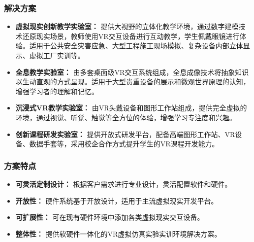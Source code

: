 \subsubsection{解决方案}
\begin{itemize}
    \item \textbf{虚拟现实创新教学实验室：} 提供大视野的立体化教学环境，通过数字建模技术还原现实场景，教师使用VR交互设备进行互动教学，学生佩戴眼镜进行体验。适用于公共安全灾害应急、大型工程施工现场模拟、复杂设备内部立体显示、虚拟工厂实训等。

    \item \textbf{全息教学实验室：} 由多套桌面级VR交互系统组成，全息成像技术将抽象知识以生动直观的方式呈现。适用于大型贵重设备的展示和微观世界原理的认知，增强学习者的理解和记忆。

    \item \textbf{沉浸式VR教学实验室：} 由VR头戴设备和图形工作站组成，提供完全虚拟的环境，通过视觉、听觉、触觉等全方位的体验，增强学习专注度和兴趣。

    \item \textbf{创新课程研发实验室：} 提供开放式研发平台，配备高端图形工作站、VR设备、数据手套等，采用校企合作方式提升学生的VR课程开发能力。
\end{itemize}

\subsubsection{方案特点}
\begin{itemize}
    \item \textbf{可灵活定制设计：} 根据客户需求进行专业设计，灵活配置软件和硬件。
    \item \textbf{开放性：} 硬件系统基于开放设计，适用于主流虚拟现实开发平台。
    \item \textbf{可扩展性：} 可在现有硬件环境中添加各类虚拟现实交互设备。
    \item \textbf{整体性：} 提供软硬件一体化的VR虚拟仿真实验实训环境解决方案。
\end{itemize}

